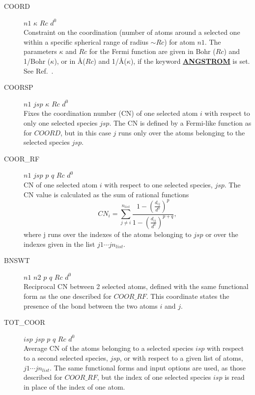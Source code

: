 \documentclass[twoside,10pt,titlepage,a4paper]{article}
\newcommand{\referto}[2]{\hyperlink{#1}{#2}}
\newcommand{\referto}[2]{\htmlref{#2}{#1}}
\newcommand{\refkeyword}[1]{%
\referto{#1}{\textbf{#1}}%
\index{#1}%
}%
\begin{document}
\begin{description}
\begin{description}
          \item[COORD]  $n1$ $\kappa$ $Rc$ $d^0$ \hfill\\
            Constraint on the coordination (number of atoms around a selected
            one within a specific spherical range of radius $\sim Rc$) for atom $n1$.
            The parameters $\kappa$ and $Rc$ for the Fermi function
            are given in Bohr ($Rc$) and 1/Bohr ($\kappa$), or
            in \AA   ($Rc$) and 1/\AA   ($\kappa$), if the
            keyword \refkeyword{ANGSTROM} is set.
            See Ref.~\cite{Sprik98a}.

          \item[COORSP] $n1$ $jsp$ $\kappa$ $Rc$ $d^0$\hfill\\
            Fixes the coordination number (CN) of one
            selected atom $i$ with respect to only one selected
            species $jsp$. The CN is defined by a Fermi-like function as for $COORD$,
            but in this case $j$ runs only over the atoms belonging to the selected
            species $jsp$.

          \item[COOR\_RF] $n1$ $jsp$ $p$ $q$ $Rc$ $d^0$\hfill\\
            CN of one selected atom $i$ with respect to one selected
            species, $jsp$.
            The CN value is calculated as the sum of rational functions
            \begin{equation}
              CN_i = \sum_{j \neq i}^{n_{list}} \frac{1-\left(\frac{d_{ij}}{d^0}\right)^{p}}
              {1-\left(\frac{d_{ij}}{d^0}\right)^{p+q}},
            \end{equation}
            where j runs over the indexes of the atoms belonging to $jsp$ or over the
            indexes given in the list $j1 \cdots jn_{list}$.

          \item[BNSWT] $n1$ $n2$  $p$ $q$ $Rc$ $d^0$\hfill\\
            Reciprocal CN between 2 selected atoms, defined with the same
            functional form as the one described for $COOR\_RF$.
            This coordinate states the presence of the bond between the
            two atoms $i$ and $j$.

          \item[TOT\_COOR] $isp$ $jsp$ $p$ $q$ $Rc$ $d^0$\hfill\\
            Average CN of the atoms belonging to a selected species $isp$
            with respect to a second selected species, $jsp$, or with respect to a given
            list of atoms, $j1 \cdots jn_{list}$.
            The same functional forms and input options are used, as those
            described for $COOR\_RF$, but the index of one selected species $isp$
            is read in place of the index of one atom.


\end{description}
\end{description}
\end{document}
